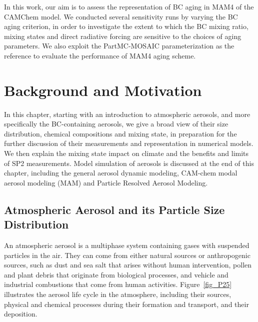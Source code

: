 \documentclass[12pt, fullpage]{uiucthesis2009_2}
\begin{document}
	In this work, our aim is to assess the representation of BC aging in MAM4 of the CAMChem model. We conducted several sensitivity runs by varying the BC aging criterion, in order to investigate the extent to which the BC mixing ratio, mixing states and direct radiative forcing are sensitive to the choices of aging parameters. We also exploit the PartMC-MOSAIC parameterization as the reference to evaluate the performance of MAM4 aging scheme. 
	
	\chapter{Background and Motivation}
	In this chapter, starting with an introduction to atmospheric aerosols, and more specifically the BC-containing aerosols, we give a broad view of their size distribution, chemical compositions and mixing state, in preparation for the further discussion of their measurements and representation in numerical models. We then explain the mixing state impact on climate and the benefits and limits of SP2 measurements. Model simulation of aerosols is discussed at the end of this chapter, including the general aerosol dynamic modeling, CAM-chem modal aerosol modeling (MAM) and Particle Resolved Aerosol Modeling.
	
	\section{Atmospheric Aerosol and its Particle Size Distribution}
	An atmospheric aerosol is a multiphase system containing gases with suspended particles in the air. They can come from either natural sources or anthropogenic sources, such as dust and sea salt that arises without human intervention, pollen and plant debris that originate from biological processes, and vehicle and industrial combustions that come from human activities. Figure~\ref{fig_P25} illustrates the aerosol life cycle in the atmosphere, including their sources, physical and chemical processes during their formation and transport, and their deposition. 
	
\end{document}
